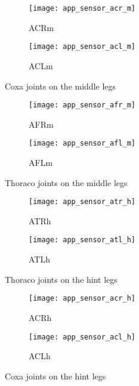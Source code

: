 \begin{figure}[H]
\centering
\begin{subfigure}{0.48\textwidth}
  \centering
  \texttt{[image: app\_sensor\_acr\_m]}
  \caption{ACRm}
  \label{fig:app_acr_m}
\end{subfigure}
\begin{subfigure}{0.48\textwidth}
  \centering
  \texttt{[image: app\_sensor\_acl\_m]}
  \caption{ACLm}
  \label{fig:app_acl_m}
\end{subfigure}
\caption{Coxa joints on the middle legs}
\label{fig:app_ac_m}
\end{figure}

\begin{figure}[H]
\centering
\begin{subfigure}{0.48\textwidth}
  \centering
  \texttt{[image: app\_sensor\_afr\_m]}
  \caption{AFRm}
  \label{fig:app_afr_m}
\end{subfigure}
\begin{subfigure}{0.48\textwidth}
  \centering
  \texttt{[image: app\_sensor\_afl\_m]}
  \caption{AFLm}
  \label{fig:app_afl_m}
\end{subfigure}
\caption{Thoraco joints on the middle legs}
\label{fig:app_af_m}
\end{figure}

\begin{figure}[H]
\centering
\begin{subfigure}{0.48\textwidth}
  \centering
  \texttt{[image: app\_sensor\_atr\_h]}
  \caption{ATRh}
  \label{fig:app_atr_h}
\end{subfigure}
\begin{subfigure}{0.48\textwidth}
  \centering
  \texttt{[image: app\_sensor\_atl\_h]}
  \caption{ATLh}
  \label{fig:app_atl_h}
\end{subfigure}
\caption{Thoraco joints on the hint legs}
\label{fig:app_at_h}
\end{figure}

\begin{figure}[H]
\centering
\begin{subfigure}{0.48\textwidth}
  \centering
  \texttt{[image: app\_sensor\_acr\_h]}
  \caption{ACRh}
  \label{fig:app_acr_h}
\end{subfigure}
\begin{subfigure}{0.48\textwidth}
  \centering
  \texttt{[image: app\_sensor\_acl\_h]}
  \caption{ACLh}
  \label{fig:app_acl_h}
\end{subfigure}
\caption{Coxa joints on the hint legs}
\label{fig:app_ac_h}
\end{figure}

